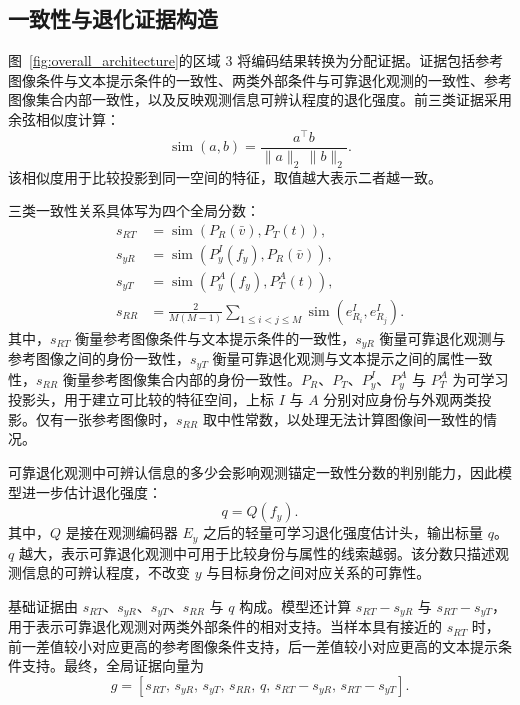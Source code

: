 \documentclass[journal]{IEEEtran}
\begin{document}
\subsection{一致性与退化证据构造}
图~\ref{fig:overall_architecture}的区域 3 将编码结果转换为分配证据。证据包括参考图像条件与文本提示条件的一致性、两类外部条件与可靠退化观测的一致性、参考图像集合内部一致性，以及反映观测信息可辨认程度的退化强度。前三类证据采用余弦相似度计算：
\begin{equation}
\label{eq:cosine_similarity}
\operatorname{sim}(a,b)=
\frac{a^{\top}b}{\|a\|_2\,\|b\|_2}.
\end{equation}
该相似度用于比较投影到同一空间的特征，取值越大表示二者越一致。

三类一致性关系具体写为四个全局分数：
\begin{subequations}
\label{eq:multi_evidence_scores}
\begin{align}
s_{RT}
&=\operatorname{sim}\!\left(P_R(\bar{v}),P_T(t)\right),\\
s_{yR}
&=\operatorname{sim}\!\left(P_y^{I}(f_y),P_R(\bar{v})\right),\\
s_{yT}
&=\operatorname{sim}\!\left(P_y^{A}(f_y),P_T^{A}(t)\right),\\
s_{RR}
&=\frac{2}{M(M-1)}
\sum_{1\leq i<j\leq M}
\operatorname{sim}\!\left(e^{I}_{R_i},e^{I}_{R_j}\right).
\end{align}
\end{subequations}
其中，$s_{RT}$ 衡量参考图像条件与文本提示条件的一致性，$s_{yR}$ 衡量可靠退化观测与参考图像之间的身份一致性，$s_{yT}$ 衡量可靠退化观测与文本提示之间的属性一致性，$s_{RR}$ 衡量参考图像集合内部的身份一致性。$P_R$、$P_T$、$P_y^{I}$、$P_y^{A}$ 与 $P_T^{A}$ 为可学习投影头，用于建立可比较的特征空间，上标 $I$ 与 $A$ 分别对应身份与外观两类投影。仅有一张参考图像时，$s_{RR}$ 取中性常数，以处理无法计算图像间一致性的情况。

可靠退化观测中可辨认信息的多少会影响观测锚定一致性分数的判别能力，因此模型进一步估计退化强度：
\begin{equation}
\label{eq:degradation_score}
q=Q(f_y).
\end{equation}
其中，$Q$ 是接在观测编码器 $E_y$ 之后的轻量可学习退化强度估计头，输出标量 $q$。$q$ 越大，表示可靠退化观测中可用于比较身份与属性的线索越弱。该分数只描述观测信息的可辨认程度，不改变 $y$ 与目标身份之间对应关系的可靠性。

基础证据由 $s_{RT}$、$s_{yR}$、$s_{yT}$、$s_{RR}$ 与 $q$ 构成。模型还计算 $s_{RT}-s_{yR}$ 与 $s_{RT}-s_{yT}$，用于表示可靠退化观测对两类外部条件的相对支持。当样本具有接近的 $s_{RT}$ 时，前一差值较小对应更高的参考图像条件支持，后一差值较小对应更高的文本提示条件支持。最终，全局证据向量为
\begin{equation}
\label{eq:global_evidence_vector}
g=
\left[
s_{RT},\,
s_{yR},\,
s_{yT},\,
s_{RR},\,
q,\,
s_{RT}-s_{yR},\,
s_{RT}-s_{yT}
\right].
\end{equation}
\end{document}

